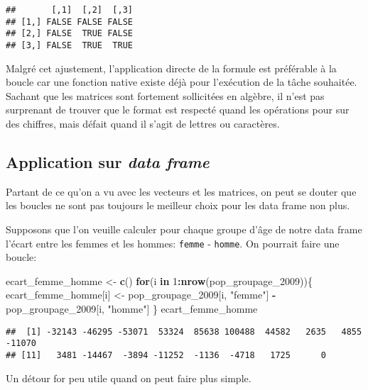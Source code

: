 \documentclass[]{book}
\newenvironment{Shaded}{\begin{snugshade}}{\end{snugshade}}
\newcommand{\KeywordTok}[1]{\textcolor[rgb]{0.13,0.29,0.53}{\textbf{#1}}}
\newcommand{\DecValTok}[1]{\textcolor[rgb]{0.00,0.00,0.81}{#1}}
\newcommand{\StringTok}[1]{\textcolor[rgb]{0.31,0.60,0.02}{#1}}
\newcommand{\ControlFlowTok}[1]{\textcolor[rgb]{0.13,0.29,0.53}{\textbf{#1}}}
\newcommand{\OperatorTok}[1]{\textcolor[rgb]{0.81,0.36,0.00}{\textbf{#1}}}
\newcommand{\NormalTok}[1]{#1}
\begin{document}
\begin{verbatim}
##       [,1]  [,2]  [,3]
## [1,] FALSE FALSE FALSE
## [2,] FALSE  TRUE FALSE
## [3,] FALSE  TRUE  TRUE
\end{verbatim}

Malgré cet ajustement, l'application directe de la formule est
préférable à la boucle car une fonction native existe déjà pour
l'exécution de la tâche souhaitée. Sachant que les matrices sont
fortement sollicitées en algèbre, il n'est pas surprenant de trouver que
le format est respecté quand les opérations pour sur des chiffres, mais
défait quand il s'agit de lettres ou caractères.

\subsection{\texorpdfstring{Application sur \emph{data
frame}}{Application sur data frame}}\label{application-sur-data-frame}

Partant de ce qu'on a vu avec les vecteurs et les matrices, on peut se
douter que les boucles ne sont pas toujours le meilleur choix pour les
data frame non plus.

Supposons que l'on veuille calculer pour chaque groupe d'âge de notre
data frame l'écart entre les femmes et les hommes: \texttt{femme} -
\texttt{homme}. On pourrait faire une boucle:

\begin{Shaded}
\begin{Highlighting}[]
\NormalTok{ecart_femme_homme <-}\StringTok{ }\KeywordTok{c}\NormalTok{()}
\ControlFlowTok{for}\NormalTok{(i }\ControlFlowTok{in} \DecValTok{1}\OperatorTok{:}\KeywordTok{nrow}\NormalTok{(pop_groupage_}\DecValTok{2009}\NormalTok{))\{}
\NormalTok{  ecart_femme_homme[i] <-}\StringTok{ }\NormalTok{pop_groupage_}\DecValTok{2009}\NormalTok{[i, }\StringTok{"femme"}\NormalTok{] }\OperatorTok{-}\StringTok{ }\NormalTok{pop_groupage_}\DecValTok{2009}\NormalTok{[i, }\StringTok{"homme"}\NormalTok{]}
\NormalTok{\}}
\NormalTok{ecart_femme_homme}
\end{Highlighting}
\end{Shaded}

\begin{verbatim}
##  [1] -32143 -46295 -53071  53324  85638 100488  44582   2635   4855 -11070
## [11]   3481 -14467  -3894 -11252  -1136  -4718   1725      0
\end{verbatim}

Un détour for peu utile quand on peut faire plus simple.
\end{document}
